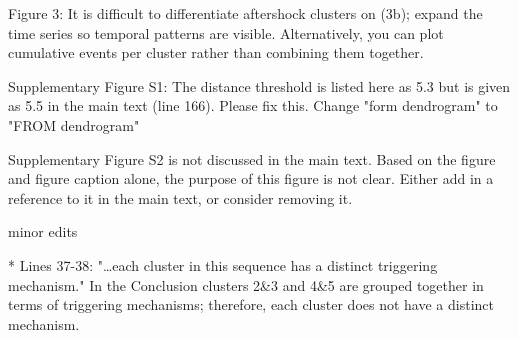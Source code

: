 \documentclass[10pt]{extarticle}
\begin{document}
\begin{Answer}
 \WorkInProgressRevTask
\end{Answer}
%
%



\begin{ReviewerComment}{1}
\noindent 
Figure 3: It is difficult to differentiate aftershock clusters on (3b); expand the time series so temporal patterns are visible. Alternatively, you can plot cumulative events per cluster rather than combining them together.  

\end{ReviewerComment}


\begin{Answer}
 \WorkInProgressRevTask
\end{Answer}
%
%



\begin{ReviewerComment}{1}
\noindent 
Supplementary Figure S1: The distance threshold is listed here as 5.3 but is given as 5.5 in the main text (line 166). Please fix this. Change "form dendrogram" to "FROM dendrogram"

\end{ReviewerComment}


\begin{Answer}
 \WorkInProgressRevTask
\end{Answer}
%
%



\begin{ReviewerComment}{1}
\noindent 
Supplementary Figure S2 is not discussed in the main text. Based on the figure and figure caption alone, the purpose of this figure is not clear. Either add in a reference to it in the main text, or consider removing it.

\end{ReviewerComment}


\begin{Answer}
 \WorkInProgressRevTask
\end{Answer}
%
%


minor edits

\begin{ReviewerComment}{1}
\noindent 
*        Lines 37-38: "…each cluster in this sequence has a distinct triggering mechanism." In the Conclusion clusters 2\&3 and 4\&5 are grouped together in terms of triggering mechanisms; therefore, each cluster does not have a distinct mechanism.  

\end{ReviewerComment}
\end{document}
